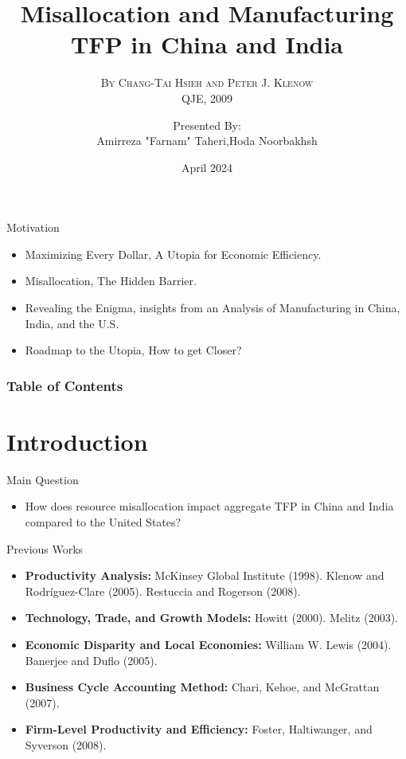 \documentclass[10pt]{beamer}
\title[Misallocation]
{Misallocation and Manufacturing TFP in China and India}
\subtitle{\textsc{By Chang-Tai Hsieh and Peter J. Klenow\\
QJE, 2009}}
\author[Hsieh \& Klenow (QJE 2009)] %
{Presented By:\\
Amirreza "Farnam" Taheri\inst{1},\;Hoda Noorbakhsh\inst{1}}
\institute[Tehran Institute for Advanced Studies] %
{
    \inst{1}%
    Department of Economics,\\
    Tehran Institute for Advanced Studies
}
\date[April 2024] %
{April 2024}
\begin{document}
\frame{\titlepage}

\begin{frame}{Motivation}
    \begin{itemize}
        \item Maximizing Every Dollar, A Utopia for Economic Efficiency.
        \item Misallocation, The Hidden Barrier.
        \item Revealing the Enigma, insights from an Analysis of Manufacturing in China, India, and the U.S.
        \item Roadmap to the Utopia, How to get Closer?
    \end{itemize}
\end{frame}


\begin{frame}
    \frametitle{Table of Contents}
    \tableofcontents
\end{frame}

\section{Introduction}

\begin{frame}{Main Question}
    \begin{itemize}
        \item How does resource misallocation impact aggregate TFP in China and India compared to the United States? 
    \end{itemize}
\end{frame}

\begin{frame}{Previous Works}
    \begin{itemize}
        \item \textbf{Productivity Analysis:} McKinsey Global Institute (1998). Klenow and Rodríguez-Clare (2005). Restuccia and Rogerson (2008).
                
        \item \textbf{Technology, Trade, and Growth Models:}  Howitt (2000). Melitz (2003).  
        
        \item \textbf{Economic Disparity and Local Economies:} William W. Lewis (2004). Banerjee and Duflo (2005).

        \item \textbf{Business Cycle Accounting Method:} Chari, Kehoe, and McGrattan (2007).

        \item \textbf{Firm-Level Productivity and Efficiency:} Foster, Haltiwanger, and Syverson (2008).
    \end{itemize}
\end{frame}
\end{document}
